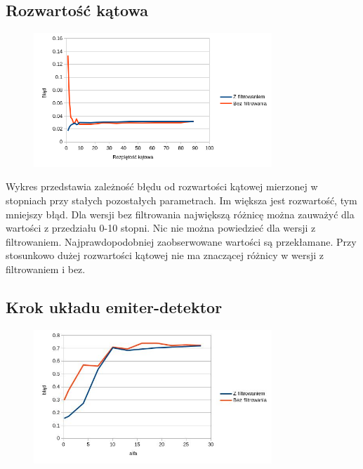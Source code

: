 \documentclass{article}
\begin{document}
\subsection{Rozwartość kątowa}
\begin{figure}[H]
\begin{center}
\includegraphics[width=0.8\textwidth]{./width.png}
\end{center}
\end{figure}

Wykres przedstawia zależność błędu od rozwartości kątowej mierzonej w stopniach przy stałych pozostałych parametrach. Im większa jest rozwartość, tym mniejszy błąd. Dla wersji bez filtrowania największą różnicę można zauważyć dla wartości z przedziału 0-10 stopni. Nic nie można powiedzieć dla wersji z filtrowaniem. Najprawdopodobniej zaobserwowane wartości są przekłamane. Przy stosunkowo dużej rozwartości kątowej nie ma znaczącej różnicy w wersji z filtrowaniem i bez. 

\subsection{Krok układu emiter-detektor}
\begin{figure}[H]
\begin{center}
\includegraphics[width=0.8\textwidth]{./alpha.jpg}
\end{center}
\end{figure}
\end{document}

